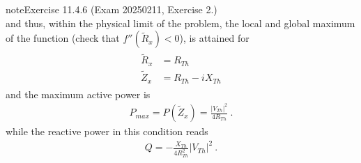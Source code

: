 \documentclass[letterpaper,10pt,english]{jupyterBook}
\begin{document}
\begin{sphinxadmonition}{note}{Exercise 11.4.6 (Exam 2025\sphinxhyphen{}02\sphinxhyphen{}11, Exercise 2.)}
\begin{equation*}
\end{equation*}
\sphinxAtStartPar
and thus, within the physical limit of the problem, the local and global maximum of the function (check that \(f''(\widetilde{R}_x) < 0\)), is attained for
\begin{equation*}
\begin{split}\begin{aligned}
  \widetilde{R}_{x} & = R_{Th} \\
  \widetilde{Z}_{x} & = R_{Th} - i X_{Th}
\end{aligned}\end{split}
\end{equation*}
\sphinxAtStartPar
and the maximum active power is
\begin{equation*}
\begin{split}P_{max} = P(\widetilde{Z}_x) = \frac{|V_{Th}|^2}{4 R_{Th} } \ .\end{split}
\end{equation*}
\sphinxAtStartPar
while the reactive power in this condition reads
\begin{equation*}
\begin{split}Q = - \frac{ X_{Th} }{4 R^2_{Th}} |V_{Th}|^2 \ .\end{split}
\end{equation*}\end{sphinxadmonition}
 \label{exercise:exam-25-02-11-exe-03}
\end{document}
